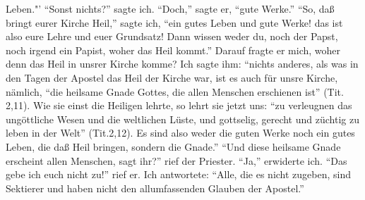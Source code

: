 Leben."' "`Sonst nichts?"' sagte ich. "`Doch,"' sagte er, "`gute
Werke."' "`So, daß bringt eurer Kirche Heil,"' sagte ich, "`ein
gutes Leben und gute Werke! das ist also eure Lehre und euer
Grundsatz! Dann wissen weder du, noch der Papst, noch irgend
ein Papist, woher das Heil kommt."' Darauf fragte er mich,
woher denn das Heil in unsrer Kirche komme? Ich sagte ihm:
"`nichts anderes, als was in den Tagen der Apostel das Heil der
Kirche war, ist es auch für unsre Kirche, nämlich, "`die heilsame
Gnade Gottes, die allen Menschen erschienen ist"' (Tit. 2,11).
Wie sie einst die Heiligen lehrte, so lehrt sie jetzt uns: "`zu 
verleugnen das ungöttliche Wesen und die weltlichen Lüste, und
gottselig, gerecht und züchtig zu leben in der Welt"' (Tit.2,12). 
Es sind also weder die guten Werke noch ein gutes Leben, die daß
Heil bringen, sondern die Gnade."' "`Und diese heilsame Gnade
erscheint allen Menschen, sagt ihr?"' rief der Priester. "`Ja,"'
erwiderte ich. "`Das gebe ich euch nicht zu!"' rief er. Ich 
antwortete: "`Alle, die es nicht zugeben, sind Sektierer und haben
nicht den allumfassenden Glauben der Apostel."'

